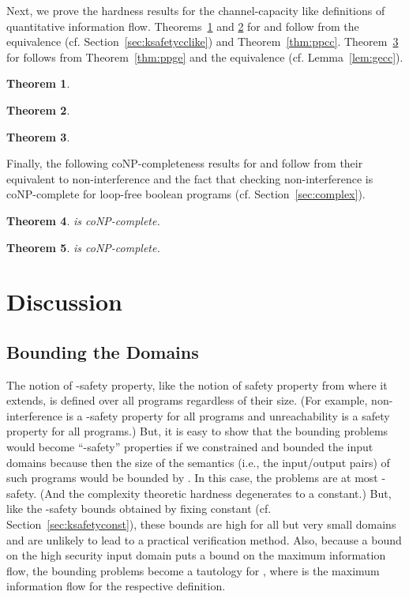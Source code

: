 \documentclass{llncs}
\newtheorem{theorem}{Theorem}[section]
\begin{document}
Next, we prove the hardness results for the channel-capacity like
definitions of quantitative information flow.
Theorems~\ref{thm:ppsecc} and \ref{thm:ppmecc} for  and
 follow from the equivalence 
(cf. Section~\ref{sec:ksafetycclike}) and Theorem~\ref{thm:ppcc}.
Theorem~\ref{thm:ppgecc} for  follows from
Theorem~\ref{thm:ppge} and the equivalence 
(cf. Lemma~\ref{lem:gecc}).
\begin{theorem}
\label{thm:ppsecc}
  
\end{theorem}
\begin{theorem}
\label{thm:ppmecc}
  
\end{theorem}
\begin{theorem}
\label{thm:ppgecc}
  
\end{theorem}

\begin{sloppypar}
Finally, the following coNP-completeness results for  and  follow from their equivalent to
non-interference and the fact that checking non-interference is
coNP-complete for loop-free boolean programs
(cf. Section~\ref{sec:complex}).
\end{sloppypar}
\begin{theorem}
\label{thm:conpbe3}
 is coNP-complete.
\end{theorem}

\begin{theorem}
\label{thm:conpbe4}
 is coNP-complete.
\end{theorem}

\section{Discussion}

\label{sec:discussion}

\subsection{Bounding the Domains}

The notion of -safety property, like the notion of safety property
from where it extends, is defined over all programs regardless of
their size.  (For example, non-interference is a -safety property
for all programs and unreachability is a safety property for all
programs.)  But, it is easy to show that the bounding problems would
become ``-safety'' properties if we constrained and bounded the
input domains because then the size of the semantics (i.e., the
input/output pairs) of such programs would be bounded by
.  In
this case, the problems are at most
-safety.
(And the complexity theoretic hardness degenerates to a constant.)
But, like the -safety bounds obtained by fixing  constant
(cf. Section~\ref{sec:ksafetyconst}), these bounds are high for all
but very small domains and are unlikely to lead to a practical
verification method.  Also, because a bound on the high security input
domain puts a bound on the maximum information flow, the bounding
problems become a tautology for , where  is the maximum
information flow for the respective definition.
\end{document}

